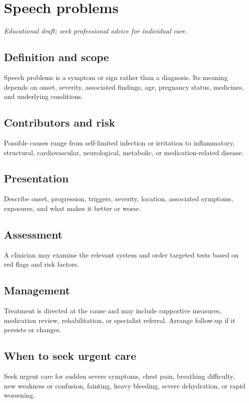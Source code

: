 \chapter{Speech problems}
\medskip
\noindent\textit{Educational draft; seek professional advice for individual care.}

\section*{Definition and scope}
Speech problems is a symptom or sign rather than a diagnosis. Its meaning depends on onset, severity, associated findings, age, pregnancy status, medicines, and underlying conditions.

\section*{Contributors and risk}
Possible causes range from self-limited infection or irritation to inflammatory, structural, cardiovascular, neurological, metabolic, or medication-related disease.

\section*{Presentation}
Describe onset, progression, triggers, severity, location, associated symptoms, exposures, and what makes it better or worse.

\section*{Assessment}
A clinician may examine the relevant system and order targeted tests based on red flags and risk factors.

\section*{Management}
Treatment is directed at the cause and may include supportive measures, medication review, rehabilitation, or specialist referral. Arrange follow-up if it persists or changes.

\section*{When to seek urgent care}
Seek urgent care for sudden severe symptoms, chest pain, breathing difficulty, new weakness or confusion, fainting, heavy bleeding, severe dehydration, or rapid worsening.

